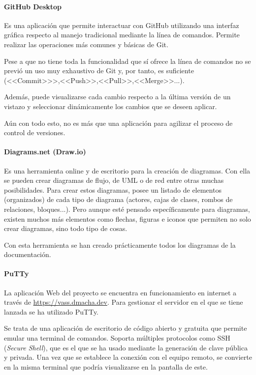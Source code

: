 \paragraph{GitHub Desktop}
Es una aplicación que permite interactuar con GitHub utilizando una interfaz
gráfica respecto al manejo tradicional mediante la línea de comandos. Permite
realizar las operaciones más comunes y básicas de Git.

Pese a que no tiene toda la funcionalidad que sí ofrece la línea de comandos no
se previó un uso muy exhaustivo de Git y, por tanto, es suficiente
(<<Commit>>>,<<Push>>,<<Pull>>,<<Merge>>...).

Además, puede visualizarse cada cambio respecto a la última versión de un
vistazo y seleccionar dinámicamente los cambios que se deseen aplicar.

Aún con todo esto, no es más que una aplicación para agilizar el proceso de
control de versiones.

\paragraph{Diagrams.net (Draw.io)}
Es una herramienta online y de escritorio para la creación de diagramas. Con
ella se pueden crear diagramas de flujo, de UML o de red entre otras muchas
posibilidades. Para crear estos diagramas, posee un listado de elementos
(organizados) de cada tipo de diagrama (actores, cajas de clases, rombos de
relaciones, bloques...). Pero aunque esté pensado específicamente para
diagramas, existen muchos más elementos como flechas, figuras e iconos que
permiten no solo crear diagramas, sino todo tipo de cosas.

Con esta herramienta se han creado prácticamente todos los diagramas de la
documentación.

\paragraph{PuTTy}
La aplicación Web del proyecto se encuentra en funcionamiento en internet a
través de \url{https://vass.dmacha.dev}. Para gestionar el servidor en el que se
tiene lanzada se ha utilizado PuTTy.

Se trata de una aplicación de escritorio de código abierto y gratuita que
permite emular una terminal de comandos. Soporta múltiples protocolos como SSH
(\textit{Secure Shell}), que es el que se ha usado mediante la generación de
clave pública y privada. Una vez que se establece la conexión con el equipo
remoto, se convierte en la misma terminal que podría visualizarse en la pantalla
de este.

